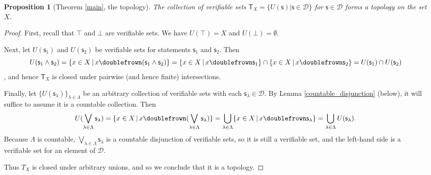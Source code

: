 \documentclass[psamsfonts]{amsart}
\newtheorem{prop}[thm]{Proposition}
\theoremstyle{definition}
\theoremstyle{remark}
\numberwithin{equation}{section}
\def\tautology{\top}
\def\contradiction{\bot}
\def\comp{\doublefrown}
\def\AND{\wedge}
\def\bigOR{\bigvee}
\newcommand{\stmt}[1][s] {\mathsf{#1}}
\newcommand{\obs}[1][s] {\mathsf{#1}}
\newcommand{\edomain}[1][D] {\mathcal{#1}}
\begin{document}
\begin{prop}[Theorem \ref{main}, the topology]
\label{topology}
The collection of verifiable sets $\mathsf{T}_X=\{U(\stmt)|\stmt\in\edomain\}$ for $\stmt\in\edomain$ forms a topology on the set $X$. 
\end{prop}
\begin{proof}
First, recall that $\tautology$ and $\contradiction$ are verifiable sets. We have $U(\tautology) = X$ and $U(\contradiction) = \emptyset$. 

Next, let $U(\stmt_1)$ and $U(\stmt_2)$ be verifiable sets for statements $\stmt_1$ and $\stmt_2$. Then $$U(\obs_1\AND\obs_2) = \{ x \in X \, | \, x \comp (\obs_1\AND\obs_2)\} =  \{ x \in X \, | \, x \comp \obs_1\} \cap \{ x \in X \, | \, x \comp \obs_2\} = U(\obs_1) \cap U(\obs_2)$$, and hence $\mathsf{T}_X$ is closed under pairwise (and hence finite) intersections. 

Finally, let $\{U(\stmt_{\lambda})\}_{\lambda\in\Lambda}$ be an arbitrary collection of verifiable sets with each $\stmt_{\lambda}\in\edomain$. By Lemma \ref{countable_disjunction} (below), it will suffice to assume it is a countable collection. Then $$U(\bigOR\limits_{\lambda\in\Lambda}\stmt_{\lambda}) = \{ x \in X \, | \, x \comp (\bigOR\limits_{\lambda\in\Lambda}\stmt_{\lambda})\} =\bigcup\limits_{\lambda\in\Lambda} \{ x \in X \, | \, x \comp \stmt_{\lambda}\} = \bigcup\limits_{\lambda\in\Lambda} U(\obs_{\lambda}).$$ Because $\Lambda$ is countable, $\bigOR\limits_{\lambda\in\Lambda}\stmt_{\lambda}$ is a countable disjunction of verifiable sets, so it is still a verifiable set, and the left-hand side is a verifiable set for an element of $\edomain$. 

Thus $T_X$ is closed under arbitrary unions, and so we conclude that it is a topology.
\end{proof}
\end{document}
